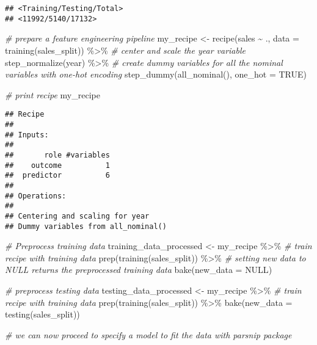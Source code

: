\documentclass[
]{article}
\newenvironment{Shaded}{\begin{snugshade}}{\end{snugshade}}
\newcommand{\AttributeTok}[1]{\textcolor[rgb]{0.77,0.63,0.00}{#1}}
\newcommand{\CommentTok}[1]{\textcolor[rgb]{0.56,0.35,0.01}{\textit{#1}}}
\newcommand{\ConstantTok}[1]{\textcolor[rgb]{0.00,0.00,0.00}{#1}}
\newcommand{\FunctionTok}[1]{\textcolor[rgb]{0.00,0.00,0.00}{#1}}
\newcommand{\NormalTok}[1]{#1}
\newcommand{\OtherTok}[1]{\textcolor[rgb]{0.56,0.35,0.01}{#1}}
\newcommand{\SpecialCharTok}[1]{\textcolor[rgb]{0.00,0.00,0.00}{#1}}
\begin{document}
\begin{verbatim}
## <Training/Testing/Total>
## <11992/5140/17132>
\end{verbatim}

\begin{Shaded}
\begin{Highlighting}[]
\CommentTok{\# prepare a feature engineering pipeline}
\NormalTok{my\_recipe }\OtherTok{\textless{}{-}} \FunctionTok{recipe}\NormalTok{(sales }\SpecialCharTok{\textasciitilde{}}\NormalTok{ ., }\AttributeTok{data =} \FunctionTok{training}\NormalTok{(sales\_split)) }\SpecialCharTok{\%\textgreater{}\%} 
  \CommentTok{\# center and scale the year variable}
  \FunctionTok{step\_normalize}\NormalTok{(year) }\SpecialCharTok{\%\textgreater{}\%} 
  \CommentTok{\# create dummy variables for all the nominal variables with one{-}hot encoding}
  \FunctionTok{step\_dummy}\NormalTok{(}\FunctionTok{all\_nominal}\NormalTok{(), }\AttributeTok{one\_hot =} \ConstantTok{TRUE}\NormalTok{)}

\CommentTok{\# print recipe}
\NormalTok{my\_recipe}
\end{Highlighting}
\end{Shaded}

\begin{verbatim}
## Recipe
## 
## Inputs:
## 
##       role #variables
##    outcome          1
##  predictor          6
## 
## Operations:
## 
## Centering and scaling for year
## Dummy variables from all_nominal()
\end{verbatim}

\begin{Shaded}
\begin{Highlighting}[]
\CommentTok{\# Preprocess training data}
\NormalTok{training\_data\_processed }\OtherTok{\textless{}{-}}\NormalTok{ my\_recipe }\SpecialCharTok{\%\textgreater{}\%} 
  \CommentTok{\# train recipe with training data}
  \FunctionTok{prep}\NormalTok{(}\FunctionTok{training}\NormalTok{(sales\_split)) }\SpecialCharTok{\%\textgreater{}\%} 
  \CommentTok{\# setting new data to NULL returns the preprocessed training data}
  \FunctionTok{bake}\NormalTok{(}\AttributeTok{new\_data =} \ConstantTok{NULL}\NormalTok{)}
  

\CommentTok{\# preprocess testing data}
\NormalTok{testing\_data\_processed }\OtherTok{\textless{}{-}}\NormalTok{ my\_recipe }\SpecialCharTok{\%\textgreater{}\%} 
  \CommentTok{\# train recipe with training data}
  \FunctionTok{prep}\NormalTok{(}\FunctionTok{training}\NormalTok{(sales\_split)) }\SpecialCharTok{\%\textgreater{}\%} 
  \FunctionTok{bake}\NormalTok{(}\AttributeTok{new\_data =} \FunctionTok{testing}\NormalTok{(sales\_split))}
  
\CommentTok{\# we can now proceed to specify a model to fit the data with parsnip package}
\end{Highlighting}
\end{Shaded}
\end{document}
